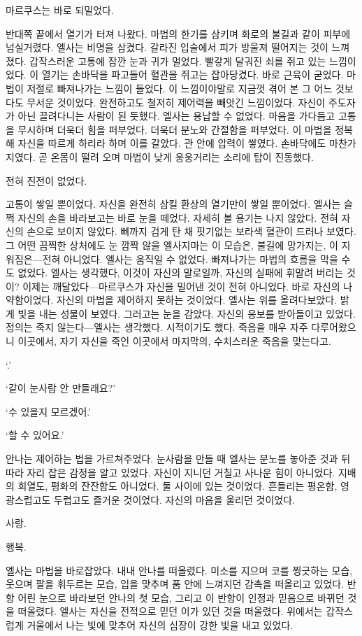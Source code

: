 마르쿠스는 바로 되밀었다.

반대쪽 끝에서 열기가 터져 나왔다. 마법의 한기를 삼키며 화로의 불길과 같이 피부에 넘실거렸다. 엘사는 비명을 삼켰다. 갈라진 입술에서 피가 방울져 떨어지는 것이 느껴졌다. 갑작스러운 고통에 잠깐 눈과 귀가 멀었다. 빨갛게 달궈진 쇠를 쥐고 있는 느낌이었다. 이 열기는 손바닥을 파고들어 혈관을 쥐고는 잡아당겼다. 바로 근육이 굳었다. 마법이 저절로 빠져나가는 느낌이 들었다. 이 느낌이야말로 지금껏 겪어 본 그 어느 것보다도 무서운 것이었다. 완전하고도 철저히 제어력을 빼앗긴 느낌이었다. 자신이 주도자가 아닌 끌려다니는 사람이 된 듯했다. 엘사는 용납할 수 없었다. 마음을 가다듬고 고통을 무시하며 더욱더 힘을 퍼부었다. 더욱더 분노와 간절함을 퍼부었다. 이 마법을 정복해 자신을 따르게 하리라 하며 이를 갈았다. 관 안에 압력이 쌓였다. 손바닥에도 마찬가지였다. 곧 온몸이 떨려 오며 마법이 낮게 웅웅거리는 소리에 탑이 진동했다.

전혀 진전이 없었다.

고통이 쌓일 뿐이었다. 자신을 완전히 삼킬 환상의 열기만이 쌓일 뿐이었다. 엘사는 슬쩍 자신의 손을 바라보고는 바로 눈을 떼었다. 자세히 볼 용기는 나지 않았다. 전혀 자신의 손으로 보이지 않았다. 뼈까지 검게 탄 채 핏기없는 보라색 혈관이 드러나 보였다. 그 어떤 끔찍한 상처에도 눈 깜짝 않을 엘사지마는 이 모습은, 불길에 망가지는, 이 지워짐은—전혀 아니었다. 엘사는 움직일 수 없었다. 빠져나가는 마법의 흐름을 막을 수도 없었다. 엘사는 생각했다, 이것이 자신의 말로일까, 자신의 실패에 휘말려 버리는 것이? 이제는 깨달았다—마르쿠스가 자신을 밀어낸 것이 전혀 아니었다. 바로 자신의 나약함이었다. 자신의 마법을 제어하지 못하는 것이었다. 엘사는 위를 올려다보았다. 밝게 빛을 내는 성물이 보였다. 그러고는 눈을 감았다. 자신의 응보를 받아들이고 있었다. 정의는 죽지 않는다—엘사는 생각했다. 시적이기도 했다. 죽음을 매우 자주 다루어왔으니 이곳에서, 자기 자신을 죽인 이곳에서 마지막의, 수치스러운 죽음을 맞는다고.

`.'

`같이 눈사람 안 만들래요?'

` 수 있을지 모르겠어.'

`할 수 있어요.'

안나는 제어하는 법을 가르쳐주었다. 눈사람을 만들 때 엘사는 분노를 놓아준 것과 뒤따라 자리 잡은 감정을 알고 있었다. 자신이 지니던 거칠고 사나운 힘이 아니었다. 지배의 희열도, 평화의 잔잔함도 아니었다. 둘 사이에 있는 것이었다. 흔들리는 평온함, 영광스럽고도 두렵고도 즐거운 것이었다. 자신의 마음을 울리던 것이었다.

사랑.

행복.

엘사는 마법을 바로잡았다. 내내 안나를 떠올렸다. 미소를 지으며 코를 찡긋하는 모습, 웃으며 팔을 휘두르는 모습, 입을 맞추며 품 안에 느껴지던 감촉을 떠올리고 있었다. 반항 어린 눈으로 바라보던 안나의 첫 모습, 그리고 이 반항이 인정과 믿음으로 바뀌던 것을 떠올렸다. 엘사는 자신을 전적으로 믿던 이가 있던 것을 떠올렸다. 위에서는 갑작스럽게 거울에서 나는 빛에 맞추어 자신의 심장이 강한 빛을 내고 있었다.

